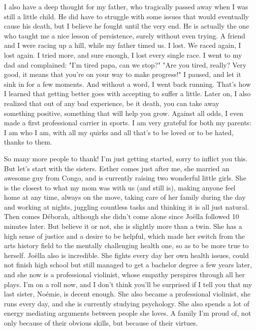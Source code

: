 I also have a deep thought for my father, who tragically passed away when I was still a little child. He did have to struggle with some issues that would eventually cause his death, but I believe he fought until the very end. He is actually the one who taught me a nice lesson of persistence, surely without even trying. A friend and I were racing up a hill, while my father timed us. I lost. We raced again, I lost again. I tried more, and sure enough, I lost every single race. I went to my dad and complained: "I'm tired papa, can we stop?" "Are you tired, really? Very good, it means that you're on your way to make progress!" I paused, and let it sink in for a few moments. And without a word, I went back running. That's how I learned that getting better goes with accepting to suffer a little. Later on, I also realized that out of any bad experience, be it death, you can take away something positive, something that will help you grow. Against all odds, I even made a first professional carrier in sports. I am very grateful for both my parents: I am who I am, with all my quirks and all that's to be loved or to be hated, thanks to them.

So many more people to thank! I'm just getting started, sorry to inflict you this. But let's start with the sisters. Esther comes just after me, she married an awesome guy from Congo, and is currently raising two wonderful little girls. She is the closest to what my mom was with us (and still is), making anyone feel home at any time, always on the move, taking care of her family during the day and working at nights, juggling countless tasks and thinking it is all just natural. Then comes Déborah, although she didn't come alone since Joëlla followed 10 minutes later. But believe it or not, she is slightly more than a twin. She has a high sense of justice and a desire to be helpful, which made her switch from the arts history field to the mentally challenging health one, so as to be more true to herself. Joëlla also is incredible. She fights every day her own health issues, could not finish high school but still managed to get a bachelor degree a few years later, and she now is a professional violinist, whose empathy perspires through all her plays. I'm on a roll now, and I don't think you'll be surprised if I tell you that my last sister, Noémie, is decent enough. She also became a professional violinist, she runs every day, and she is currently studying psychology. She also spends a lot of energy mediating arguments between people she loves. A family I'm proud of, not only because of their obvious skills, but because of their virtues.

